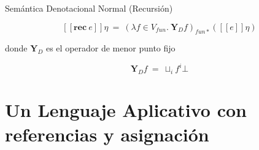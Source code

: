 \documentclass[handout]{beamer}
\newcommand{\se}[1]{\mbox{$[\![#1]\!]$}}
\begin{document}
\begin{frame}{Semántica Denotacional Normal (Recursión)}

\[ \se{\textbf{rec}\  e} \eta \ =\  (\lambda f \in  V_{fun}.\ \textbf{Y}_D f)_{fun*} (\se{e}\eta ) \]

\bigskip

donde $\textbf{Y}_{D}$ es el operador de menor punto fijo

\[\textbf{Y}_D f\  =\  \sqcup_i f^i \bot\]

\end{frame}


\section{Un Lenguaje Aplicativo con referencias y asignación}
\end{document}
